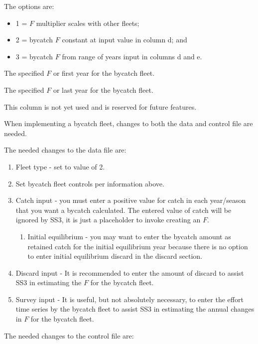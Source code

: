 The options are:  
\begin{itemize}
  	\item 1 = $F$ multiplier scales with other fleets;
  	\item 2 = bycatch $F$ constant at input value in column d; and
  	\item 3 = bycatch $F$ from range of years input in columns d and e.
\end{itemize}

The specified $F$ or first year for the bycatch fleet.

The specified $F$ or last year for the bycatch fleet.

This column is not yet used and is reserved for future features.

When implementing a bycatch fleet, changes to both the data and control file are needed.  

The needed changes to the data file are:

\begin{enumerate}
	\item Fleet type - set to value of 2.
	\item Set bycatch fleet controls per information above.
	\item Catch input - you must enter a positive value for catch in each year/season that you want a bycatch calculated. The entered value of catch will be ignored by SS3, it is just a placeholder to invoke creating an $F$.
	\begin{enumerate}
		\item Initial equilibrium - you may want to enter the bycatch amount as retained catch for the initial equilibrium year because there is no option to enter initial equilibrium discard in the discard section.
	\end{enumerate}	
	\item Discard input - It is recommended to enter the amount of discard to assist SS3 in estimating the $F$ for the bycatch fleet.
	\item Survey input - It is useful, but not absolutely necessary, to enter the effort time series by the bycatch fleet to assist SS3 in estimating the annual changes in $F$ for the bycatch fleet.
\end{enumerate}

The needed changes to the control file are:

